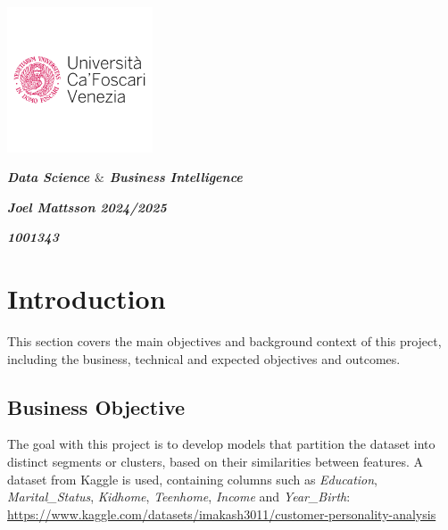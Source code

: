 \documentclass[11pt]{article}
\begin{document}
\begin{center}
{\large \textbf{\textit{\includegraphics[width=4.3cm,height=4.3cm]{./images/image4.png} }}}
\end{center}

\begin{center}
{\large \textbf{\textit{Data Science $\&$ Business Intelligence}}}
\end{center}


\begin{center}
{\large \textbf{\textit{Joel Mattsson 2024/2025}}}
\end{center}


\begin{center}
{\large \textbf{\textit{1001343}}}
\end{center}



\tableofcontents
\vspace{6\baselineskip}
\section{Introduction}

This section covers the main objectives and background context of this project, including the business, technical and expected objectives and outcomes.

\vspace{1\baselineskip}
\subsection{Business Objective}

The goal with this project is to develop models that partition the dataset into distinct segments or clusters, based on their similarities between features. A dataset from Kaggle is used, containing columns such as \textit{Education}, \textit{Marital\_Status}, \textit{Kidhome}, \textit{Teenhome}, \textit{Income} and \textit{Year\_Birth}: \url{https://www.kaggle.com/datasets/imakash3011/customer-personality-analysis}
\end{document}
